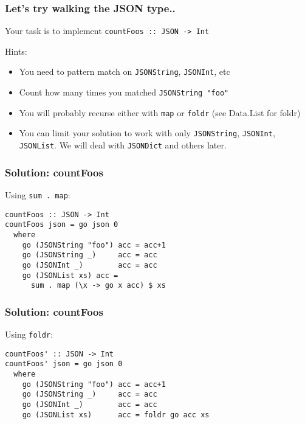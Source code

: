 \documentclass{beamer}
\begin{document}
\begin{frame}[fragile]
\frametitle{Let's try walking the JSON type..}

Your task is to implement \verb+countFoos :: JSON -> Int+

\bigskip

Hints:
\begin{itemize}
\item You need to pattern match on \verb+JSONString+, \verb+JSONInt+, etc
\item Count how many times you matched \verb+JSONString "foo"+
\item You will probably recurse either with \verb+map+ or \verb+foldr+
  (see Data.List for foldr)
\item You can limit your solution to work with only \verb+JSONString+,
  \verb+JSONInt+, \verb+JSONList+.  We will deal with \verb+JSONDict+
  and others later.
\end{itemize}

\end{frame}


\begin{frame}[fragile]
\frametitle{Solution: countFoos}

Using \verb+sum . map+:

{\small
\begin{verbatim}
countFoos :: JSON -> Int
countFoos json = go json 0
  where
    go (JSONString "foo") acc = acc+1
    go (JSONString _)     acc = acc
    go (JSONInt _)        acc = acc
    go (JSONList xs) acc =
      sum . map (\x -> go x acc) $ xs
\end{verbatim}
}
\end{frame}

\begin{frame}[fragile]
\frametitle{Solution: countFoos}

Using \verb+foldr+:

{\small
\begin{verbatim}
countFoos' :: JSON -> Int
countFoos' json = go json 0
  where
    go (JSONString "foo") acc = acc+1
    go (JSONString _)     acc = acc
    go (JSONInt _)        acc = acc
    go (JSONList xs)      acc = foldr go acc xs
\end{verbatim}
}

\end{frame}



\end{document}
